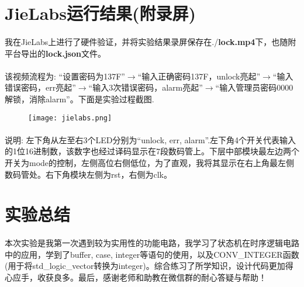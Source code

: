 \documentclass[UTF8, onecolumn, a4paper]{article}
\begin{document}
\section{JieLabs运行结果(附录屏)}
\paragraph*{}
我在JieLabs上进行了硬件验证，并将实验结果录屏保存在./\textbf{lock.mp4}下，也随附平台导出的\textbf{lock.json}文件。
\paragraph*{}
该视频流程为: “设置密码为137F”$\rightarrow$“输入正确密码137F，unlock亮起”$\rightarrow$“输入错误密码，err亮起”$\rightarrow$“输入3次错误密码，alarm亮起”$\rightarrow$“输入管理员密码0000解锁，消除alarm”。下面是实验过程截图.
\begin{figure}[htb]
	\centering
	\texttt{[image: jielabs.png]}
\end{figure}
\paragraph*{}
说明: 左下角从左至右3个LED分别为“unlock, err, alarm”.左下角4个开关代表输入的1位16进制数，该数字也经过译码显示在7段数码管上。下层中部模块最左边两个开关为mode的控制，左侧高位右侧低位，为了直观，我将其显示在右上角最左侧数码管处。右下角模块左侧为rst，右侧为clk。
\section{实验总结}
\paragraph*{}
本次实验是我第一次遇到较为实用性的功能电路，我学习了状态机在时序逻辑电路中的应用，学到了buffer, case, integer等语句的使用，以及CONV\_INTEGER函数(用于将std\_logic\_vector转换为integer)。综合练习了所学知识，设计代码更加得心应手，收获良多。最后，感谢老师和助教在微信群的耐心答疑与帮助！
\end{document}

